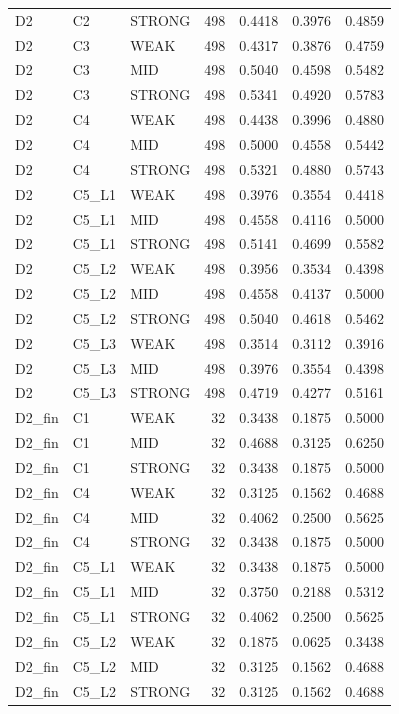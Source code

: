 \begin{tabular}{lllrrrr}
D2 & C2 & STRONG & 498 & 0.4418 & 0.3976 & 0.4859 \\
D2 & C3 & WEAK & 498 & 0.4317 & 0.3876 & 0.4759 \\
D2 & C3 & MID & 498 & 0.5040 & 0.4598 & 0.5482 \\
D2 & C3 & STRONG & 498 & 0.5341 & 0.4920 & 0.5783 \\
D2 & C4 & WEAK & 498 & 0.4438 & 0.3996 & 0.4880 \\
D2 & C4 & MID & 498 & 0.5000 & 0.4558 & 0.5442 \\
D2 & C4 & STRONG & 498 & 0.5321 & 0.4880 & 0.5743 \\
D2 & C5\_L1 & WEAK & 498 & 0.3976 & 0.3554 & 0.4418 \\
D2 & C5\_L1 & MID & 498 & 0.4558 & 0.4116 & 0.5000 \\
D2 & C5\_L1 & STRONG & 498 & 0.5141 & 0.4699 & 0.5582 \\
D2 & C5\_L2 & WEAK & 498 & 0.3956 & 0.3534 & 0.4398 \\
D2 & C5\_L2 & MID & 498 & 0.4558 & 0.4137 & 0.5000 \\
D2 & C5\_L2 & STRONG & 498 & 0.5040 & 0.4618 & 0.5462 \\
D2 & C5\_L3 & WEAK & 498 & 0.3514 & 0.3112 & 0.3916 \\
D2 & C5\_L3 & MID & 498 & 0.3976 & 0.3554 & 0.4398 \\
D2 & C5\_L3 & STRONG & 498 & 0.4719 & 0.4277 & 0.5161 \\
D2\_fin & C1 & WEAK & 32 & 0.3438 & 0.1875 & 0.5000 \\
D2\_fin & C1 & MID & 32 & 0.4688 & 0.3125 & 0.6250 \\
D2\_fin & C1 & STRONG & 32 & 0.3438 & 0.1875 & 0.5000 \\
D2\_fin & C4 & WEAK & 32 & 0.3125 & 0.1562 & 0.4688 \\
D2\_fin & C4 & MID & 32 & 0.4062 & 0.2500 & 0.5625 \\
D2\_fin & C4 & STRONG & 32 & 0.3438 & 0.1875 & 0.5000 \\
D2\_fin & C5\_L1 & WEAK & 32 & 0.3438 & 0.1875 & 0.5000 \\
D2\_fin & C5\_L1 & MID & 32 & 0.3750 & 0.2188 & 0.5312 \\
D2\_fin & C5\_L1 & STRONG & 32 & 0.4062 & 0.2500 & 0.5625 \\
D2\_fin & C5\_L2 & WEAK & 32 & 0.1875 & 0.0625 & 0.3438 \\
D2\_fin & C5\_L2 & MID & 32 & 0.3125 & 0.1562 & 0.4688 \\
D2\_fin & C5\_L2 & STRONG & 32 & 0.3125 & 0.1562 & 0.4688 \\
\bottomrule
\end{tabular}
